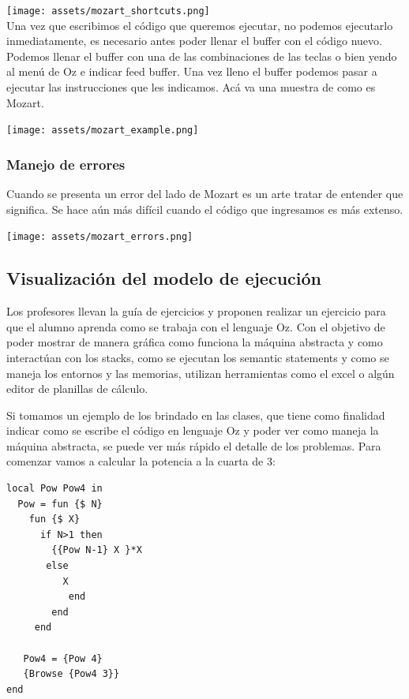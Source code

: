 \documentclass[a4paper,11pt]{article}
\begin{document}
\texttt{[image: assets/mozart\_shortcuts.png]}\\[1cm]

Una vez que escribimos el código que queremos ejecutar, no podemos ejecutarlo inmediatamente, es necesario antes poder llenar el buffer con el código nuevo. Podemos llenar el buffer con una de las combinaciones de las teclas o bien yendo al menú de Oz e indicar feed buffer. Una vez lleno el buffer podemos pasar a ejecutar las instrucciones que les indicamos.
Acá va una muestra de como es Mozart.

\texttt{[image: assets/mozart\_example.png]}\\[1cm]

\subsubsection{Manejo de errores}

Cuando se presenta un error del lado de Mozart es un arte tratar de entender que significa. Se hace aún más difícil cuando el código que ingresamos es más extenso.

\texttt{[image: assets/mozart\_errors.png]}\\[1cm]

\subsection{Visualización del modelo de ejecución}

Los profesores llevan la guía de ejercicios y proponen realizar un ejercicio para que el alumno aprenda como se trabaja con el lenguaje Oz. Con el objetivo de poder mostrar de manera gráfica como funciona la máquina abstracta y como interactúan con los stacks, como se ejecutan los semantic statements y como se maneja los entornos y las memorias, utilizan herramientas como el excel o algún editor de planillas de cálculo.

Si tomamos un ejemplo de los brindado en las clases, que tiene como finalidad indicar como se escribe el código en lenguaje Oz y poder ver como maneja la máquina abstracta, se puede ver más rápido el detalle de los problemas.
Para comenzar vamos a calcular la potencia a la cuarta de 3:

\begin{lstlisting}[language=oz]
local Pow Pow4 in
  Pow = fun {$ N}
	fun {$ X}
	  if N>1 then
        {{Pow N-1} X }*X
	   else
		  X
	       end
	    end
	 end

   Pow4 = {Pow 4}
   {Browse {Pow4 3}}
end
\end{lstlisting}
\end{document}
